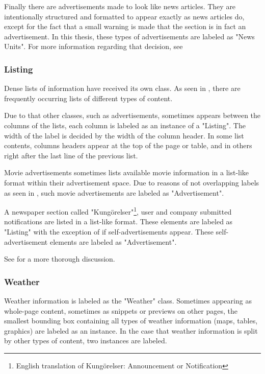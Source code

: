 \documentclass[oneside, english, bibtex]{kththesis}
\begin{document}
Finally there are advertisements made to look like news articles.
They are intentionally structured and formatted to appear exactly as news articles do,
except for the fact that a small warning is made that the section is in fact an advertisement.
In this thesis, these types of advertisements are labeled as "News Units". For more information regarding that decision, see 

\subsubsection{Listing}
\label{subsub:labellistings}
Dense lists of information have received its own class. As seen in ,
there are frequently occurring lists of different types of content.

Due to that other classes, such as advertisements, sometimes appears between the columns of the lists, each column is labeled as an instance of a "Listing".
The width of the label is decided by the width of the column header. In some list contents, columns headers appear at the top of the page or table,
and in others right after the last line of the previous list.

Movie advertisements sometimes lists available movie information in a list-like format within their advertisement space. Due to reasons of not overlapping labels as seen in , such movie advertisements are labeled as "Advertisement". 

A newspaper section called "Kung\"orelser"\footnote{English translation of Kung\"orelser: Announcement or Notification}, user and company submitted notifications are listed in a list-like format. These elements are labeled as "Listing" with the exception of if self-advertisements appear. These self-advertisement elements are labeled as "Advertisement".  

See  for a more thorough discussion.


\subsubsection{Weather}

Weather information is labeled as the "Weather" class.
Sometimes appearing as whole-page content, sometimes as snippets or previews on other pages, the smallest bounding box containing all types of weather information (maps, tables, graphics) are labeled as an instance.
In the case that weather information is split by other types of content, two instances are labeled.
\end{document}
